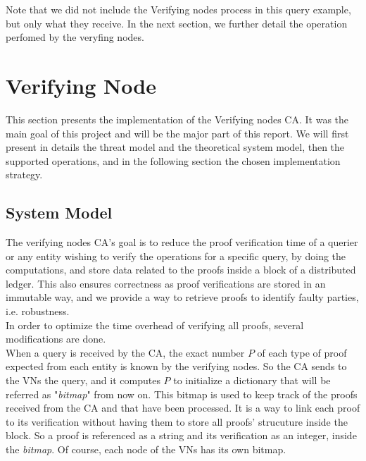 \documentclass{article}
\begin{document}
Note that we did not include the Verifying nodes process in this query example, but only what they receive. In the next section, we further detail the operation perfomed by the veryfing nodes.

\section{Verifying  Node}
This section presents the implementation of the Verifying nodes CA. It was the main goal of this project and will be the major part of this report. We will first present in details the threat model and the theoretical system model, then the supported operations, and in the following section the chosen implementation strategy.\\
\subsection{System Model}
The verifying nodes CA's goal is to reduce the proof verification time of a querier or any entity wishing to verify the operations for a specific query, by doing the computations, and store data related to the proofs inside a block of a distributed ledger. This also ensures correctness as proof verifications are stored in an immutable way, and we provide a way to retrieve proofs to identify faulty parties, i.e. robustness.\\
In order to optimize the time overhead of verifying all proofs, several modifications are done.\\

When a query is received by the CA,  the exact number $P$ of each type of proof expected from each entity is known by the verifying nodes. So the CA sends to the VNs the query, and it computes $P$ to initialize a dictionary that will be referred as "\textit{bitmap}" from now on. This bitmap is used to keep track of the proofs received from the CA and that have been processed. It is a way to link each proof to its verification without having them to store all proofs' strucuture inside the block. So a proof is referenced as a string and its verification as an integer, inside the \textit{bitmap}. Of course, each node of the VNs has its own bitmap.\\
\end{document}

